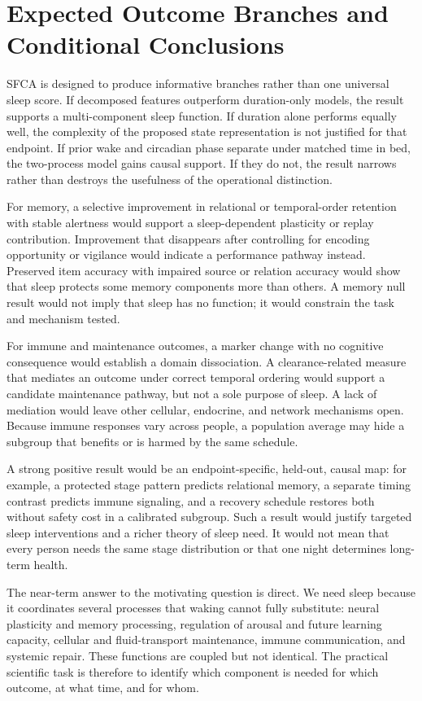 \documentclass[conference]{IEEEtran}
\begin{document}
\section{Expected Outcome Branches and Conditional Conclusions}
SFCA is designed to produce informative branches rather than one universal sleep score. If decomposed features outperform duration-only models, the result supports a multi-component sleep function. If duration alone performs equally well, the complexity of the proposed state representation is not justified for that endpoint. If prior wake and circadian phase separate under matched time in bed, the two-process model gains causal support. If they do not, the result narrows rather than destroys the usefulness of the operational distinction.

For memory, a selective improvement in relational or temporal-order retention with stable alertness would support a sleep-dependent plasticity or replay contribution. Improvement that disappears after controlling for encoding opportunity or vigilance would indicate a performance pathway instead. Preserved item accuracy with impaired source or relation accuracy would show that sleep protects some memory components more than others. A memory null result would not imply that sleep has no function; it would constrain the task and mechanism tested.

For immune and maintenance outcomes, a marker change with no cognitive consequence would establish a domain dissociation. A clearance-related measure that mediates an outcome under correct temporal ordering would support a candidate maintenance pathway, but not a sole purpose of sleep. A lack of mediation would leave other cellular, endocrine, and network mechanisms open. Because immune responses vary across people, a population average may hide a subgroup that benefits or is harmed by the same schedule.

A strong positive result would be an endpoint-specific, held-out, causal map: for example, a protected stage pattern predicts relational memory, a separate timing contrast predicts immune signaling, and a recovery schedule restores both without safety cost in a calibrated subgroup. Such a result would justify targeted sleep interventions and a richer theory of sleep need. It would not mean that every person needs the same stage distribution or that one night determines long-term health.

The near-term answer to the motivating question is direct. We need sleep because it coordinates several processes that waking cannot fully substitute: neural plasticity and memory processing, regulation of arousal and future learning capacity, cellular and fluid-transport maintenance, immune communication, and systemic repair. These functions are coupled but not identical. The practical scientific task is therefore to identify which component is needed for which outcome, at what time, and for whom.
\end{document}
